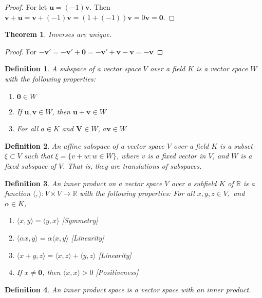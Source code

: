 \documentclass[crop=false,class=book]{standalone}
\theoremstyle{mystyle}
\newtheorem{theorem}{Theorem}[section]
\newtheorem{definition}{Definition}[section]
\begin{document}
\begin{proof}
For let $\mathbf{u} = (-1)\mathbf{v}$. Then $\mathbf{v}+\mathbf{u} = \mathbf{v}+(-1)\mathbf{v} = (1+(-1))\mathbf{v} = 0\mathbf{v} = \mathbf{0}$.
\end{proof}
\begin{theorem}
Inverses are unique.
\end{theorem}
\begin{proof}
For $-\mathbf{v}'=-\mathbf{v}'+\mathbf{0}=-\mathbf{v}'+\mathbf{v}-\mathbf{v}=- \mathbf{v}$
\end{proof}
\begin{definition}
A subspace of a vector space $V$ over a field $K$ is a vector space $W$ with the following properties:
\begin{enumerate}
    \item $\mathbf{0} \in W$
    \item If $\mathbf{u,v}\in W$, then $\mathbf{u}+\mathbf{v} \in W$
    \item For all $a\in K$ and $\mathbf{V} \in W$, $a\mathbf{v} \in W$
\end{enumerate}
\end{definition}
\begin{definition}
An affine subspace of a vector space $V$ over a field $K$ is a subset $\xi\subset V$ such that $\xi = \{v+w:w\in W\}$, where $v$ is a fixed vector in $V$, and $W$ is a fixed subspace of $V$. That is, they are translations of subspaces.
\end{definition}
\begin{definition}
An inner product on a vector space $V$ over a subfield $K$ of $\mathbb{R}$ is a function $\langle , \rangle:V\times V\rightarrow \mathbb{R}$ with the following properties: For all $x,y,z \in V,$ and $\alpha \in K$,
\begin{enumerate}
    \item $\langle x,y \rangle = \langle y,x \rangle$ \hfill [Symmetry]
    \item $\langle \alpha x, y \rangle = \alpha \langle x,y \rangle$ \hfill [Linearity]
    \item $\langle x+y,z \rangle = \langle x,z\rangle + \langle y,z \rangle$ \hfill [Linearity]
    \item  If $x\ne \mathbf{0}$, then $\langle x,x\rangle >0$ \hfill [Positiveness]
\end{enumerate}
\end{definition}
\begin{definition}
An inner product space is a vector space with an inner product.
\end{definition}
\end{document}
